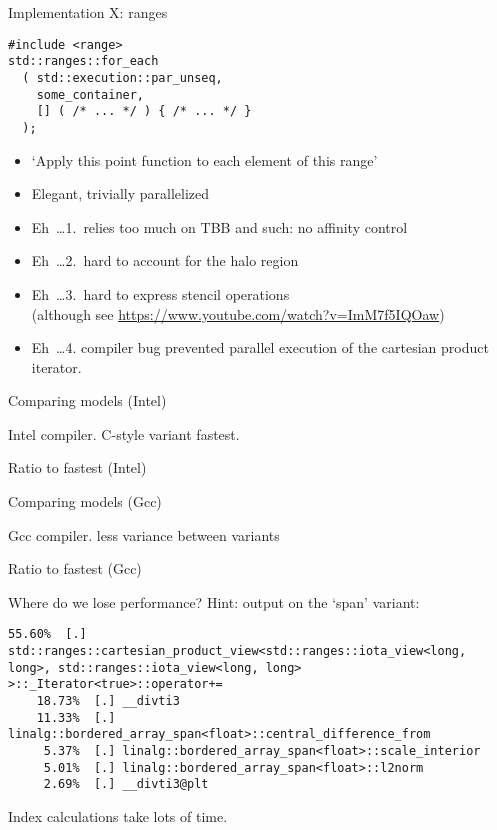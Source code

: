\documentclass[10pt]{beamer}
\begin{document}
\begin{numberedframe}{Implementation X: ranges}
\begin{lstlisting}
#include <range>
std::ranges::for_each
  ( std::execution::par_unseq,
    some_container,
    [] ( /* ... */ ) { /* ... */ }
  );
\end{lstlisting}
  \begin{itemize}
  \item `Apply this point function to each element of this range'
  \item Elegant, trivially parallelized
  \item Eh~\ldots 1.~relies too much on TBB and such: no affinity control
  \item Eh~\ldots 2.~hard to account for the halo region
  \item Eh~\ldots 3.~hard to express stencil operations\\
    (although see \url{https://www.youtube.com/watch?v=ImM7f5IQOaw})
  \item Eh~\ldots 4. compiler bug prevented parallel execution
    of the cartesian product iterator.
  \end{itemize}
\end{numberedframe}


\begin{numberedframe}{Comparing models (Intel)}
  

  Intel compiler. C-style variant fastest.
\end{numberedframe}

\begin{numberedframe}{Ratio to fastest (Intel)}
  
\end{numberedframe}

\begin{numberedframe}{Comparing models (Gcc)}
  

  Gcc compiler. less variance between variants
\end{numberedframe}

\begin{numberedframe}{Ratio to fastest (Gcc)}
  
\end{numberedframe}

\begin{numberedframe}{Where do we lose performance?}
  Hint:  output on the `span' variant:
\begin{lstlisting}[language=verbatim]
    55.60%  [.] std::ranges::cartesian_product_view<std::ranges::iota_view<long, long>, std::ranges::iota_view<long, long> >::_Iterator<true>::operator+=
    18.73%  [.] __divti3
    11.33%  [.] linalg::bordered_array_span<float>::central_difference_from
     5.37%  [.] linalg::bordered_array_span<float>::scale_interior
     5.01%  [.] linalg::bordered_array_span<float>::l2norm
     2.69%  [.] __divti3@plt
\end{lstlisting}
Index calculations take lots of time.
\end{numberedframe}
\end{document}

